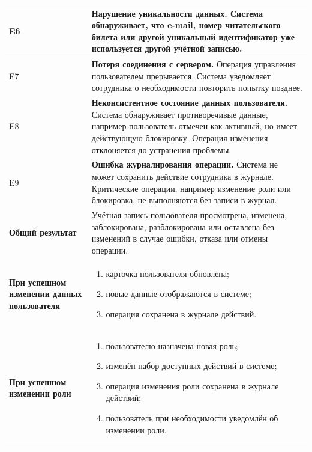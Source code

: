 \documentclass[12pt,a4paper]{article}
\begin{document}
\begin{xltabular}{\textwidth}{
			|>{\raggedright\arraybackslash}p{2.7cm}
			|>{\raggedright\arraybackslash}X|
		}
		E6 &
		\textbf{Нарушение уникальности данных.}
		Система обнаруживает, что e-mail, номер читательского билета или другой
		уникальный идентификатор уже используется другой учётной записью. \\
		\hline
		
		E7 &
		\textbf{Потеря соединения с сервером.}
		Операция управления пользователем прерывается. Система уведомляет
		сотрудника о необходимости повторить попытку позднее. \\
		\hline
		
		E8 &
		\textbf{Неконсистентное состояние данных пользователя.}
		Система обнаруживает противоречивые данные, например пользователь
		отмечен как активный, но имеет действующую блокировку. Операция
		изменения отклоняется до устранения проблемы. \\
		\hline
		
		E9 &
		\textbf{Ошибка журналирования операции.}
		Система не может сохранить действие сотрудника в журнале. Критические
		операции, например изменение роли или блокировка, не выполняются без
		записи в журнал. \\
		\hline
		
		
		\textbf{Общий результат} &
		Учётная запись пользователя просмотрена, изменена, заблокирована,
		разблокирована или оставлена без изменений в случае ошибки, отказа
		или отмены операции. \\
		\hline
		
		\textbf{При успешном изменении данных пользователя} &
		\begin{enumerate}
			\item карточка пользователя обновлена;
			\item новые данные отображаются в системе;
			\item операция сохранена в журнале действий.
		\end{enumerate} \\
		\hline
		
		\textbf{При успешном изменении роли} &
		\begin{enumerate}
			\item пользователю назначена новая роль;
			\item изменён набор доступных действий в системе;
			\item операция изменения роли сохранена в журнале действий;
			\item пользователь при необходимости уведомлён об изменении роли.
		\end{enumerate} \\
		\hline
		

\end{xltabular}
\end{document}
